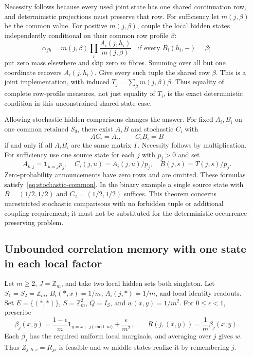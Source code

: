 \documentclass[11pt]{article}
\theoremstyle{remark}
\begin{document}
Necessity follows because every used joint state has one shared continuation row, and deterministic projections must preserve that row. For sufficiency let $m(j,\beta)$ be the common value. For positive $m(j,\beta)$, couple the local hidden states independently conditional on their common row profile $\beta$:
\[
 \alpha_{jh}=m(j,\beta)\prod_i\frac{A_i(j,h_i)}{m(j,\beta)}
 \quad\text{if every }B_i(h_i,-)=\beta;
\]
put zero mass elsewhere and skip zero $m$ fibres. Summing over all but one coordinate recovers $A_i(j,h_i)$. Give every such tuple the shared row $\beta$. This is a joint implementation, with induced $T_j=\sum_\beta m(j,\beta)\beta$. Thus equality of complete row-profile measures, not just equality of $T_i$, is the exact deterministic condition in this unconstrained shared-state case.

Allowing stochastic hidden comparisons changes the answer. For fixed $A_i,B_i$ on one common retained $S_0$, there exist $A,B$ and stochastic $C_i$ with
\begin{equation}\label{eq:stochastic-common}
 AC_i=A_i,\qquad C_iB_i=B
\end{equation}
if and only if all $A_iB_i$ are the same matrix $T$. Necessity follows by multiplication. For sufficiency use one source state for each $j$ with $p_j>0$ and set
\[
 A_{k,j}=\mathbf1_{k=j}p_j,
 \quad C_i(j,u)=A_i(j,u)/p_j,
 \quad B(j,s)=T(j,s)/p_j.
\]
Zero-probability announcements have zero rows and are omitted. These formulas satisfy~\eqref{eq:stochastic-common}. In the binary example a single source state with $B=(1/2,1/2)$ and $C_2=(1/2,1/2)$ suffices. This theorem concerns unrestricted stochastic comparisons with no forbidden tuple or additional coupling requirement; it must not be substituted for the deterministic occurrence-preserving problem.

\subsection{Unbounded correlation memory with one state in each local factor}

Let $m\ge2$, $J=\mathbb Z_m$, and take two local hidden sets both singleton. Let $S_1=S_2=\mathbb Z_m$, $B_i(\ast,x)=1/m$, $A_i(j,\ast)=1/m$, and local identity readouts. Set $E=\{(\ast,\ast)\}$, $S=\mathbb Z_m^2$, $Q=I_S$, and $w(x,y)=1/m^2$. For $0\le\epsilon<1$, prescribe
\begin{equation}\label{eq:correlation-example}
 \beta_j(x,y)=\frac{1-\epsilon}{m}\mathbf1_{y=x+j\pmod m}
 +\frac{\epsilon}{m^2},\qquad
 R(j,(x,y))=\frac1m\beta_j(x,y).
\end{equation}
Each $\beta_j$ has the required uniform local marginals, and averaging over $j$ gives $w$. Thus $Z_{j,h,s}=R_{js}$ is feasible and $m$ middle states realize it by remembering $j$.
\end{document}
